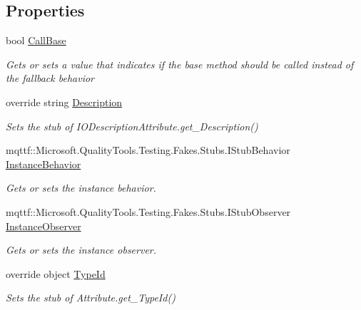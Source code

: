 \subsection*{Properties}
\begin{DoxyCompactItemize}
\item 
bool \hyperlink{class_system_1_1_i_o_1_1_fakes_1_1_stub_i_o_description_attribute_a80c7cef8e1d8b24b96e1383570a1346d}{Call\-Base}
\begin{DoxyCompactList}\small\item\em Gets or sets a value that indicates if the base method should be called instead of the fallback behavior\end{DoxyCompactList}\item 
override string \hyperlink{class_system_1_1_i_o_1_1_fakes_1_1_stub_i_o_description_attribute_a4c782ffbf8636fa1b279f6e2de604245}{Description}
\begin{DoxyCompactList}\small\item\em Sets the stub of I\-O\-Description\-Attribute.\-get\-\_\-\-Description()\end{DoxyCompactList}\item 
mqttf\-::\-Microsoft.\-Quality\-Tools.\-Testing.\-Fakes.\-Stubs.\-I\-Stub\-Behavior \hyperlink{class_system_1_1_i_o_1_1_fakes_1_1_stub_i_o_description_attribute_a68479a7dc3f826823a6ad0ec90f5eac3}{Instance\-Behavior}
\begin{DoxyCompactList}\small\item\em Gets or sets the instance behavior.\end{DoxyCompactList}\item 
mqttf\-::\-Microsoft.\-Quality\-Tools.\-Testing.\-Fakes.\-Stubs.\-I\-Stub\-Observer \hyperlink{class_system_1_1_i_o_1_1_fakes_1_1_stub_i_o_description_attribute_a77afdd4659c80bdebbf86a68ddb52ccd}{Instance\-Observer}
\begin{DoxyCompactList}\small\item\em Gets or sets the instance observer.\end{DoxyCompactList}\item 
override object \hyperlink{class_system_1_1_i_o_1_1_fakes_1_1_stub_i_o_description_attribute_a3e38f9273a0f069b082cad11eb12b3ac}{Type\-Id}
\begin{DoxyCompactList}\small\item\em Sets the stub of Attribute.\-get\-\_\-\-Type\-Id()\end{DoxyCompactList}\end{DoxyCompactItemize}


